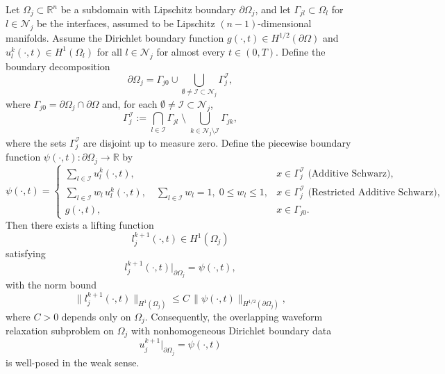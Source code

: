 \documentclass[a4paper, 11pt]{article}
\theoremstyle{remark}
\begin{document}
\begin{theorem}{}
Let $\Omega_j \subset \mathbb{R}^n$ be a subdomain with Lipschitz boundary $\partial\Omega_j$, and let $\Gamma_{jl} \subset \Omega_l$ for $l \in \mathcal{N}_j$ be the interfaces, assumed to be Lipschitz $(n-1)$-dimensional manifolds. Assume the Dirichlet boundary function $g(\cdot, t) \in H^{1/2}(\partial\Omega)$ and $u_l^k(\cdot, t) \in H^{1}(\Omega_{l})$ for all $l \in \mathcal{N}_j$ for almost every $t \in (0,T)$. Define the boundary decomposition
\[
\partial\Omega_j = \Gamma_{j0} \cup \bigcup_{\emptyset \neq \mathcal{I} \subset \mathcal{N}_j} \Gamma_j^{\mathcal{I}},
\]
where $\Gamma_{j0} = \partial \Omega_j \cap \partial \Omega$ and, for each $\emptyset \neq \mathcal{I} \subset \mathcal{N}_j$,
\[
\Gamma_j^{\mathcal{I}} := \bigcap_{l \in \mathcal{I}} \Gamma_{jl} \;\setminus\; \bigcup_{k \in \mathcal{N}_j \setminus \mathcal{I}} \Gamma_{jk},
\]
where the sets $\Gamma_j^{\mathcal{I}}$ are disjoint up to measure zero. Define the piecewise boundary function $\psi(\cdot, t) : \partial \Omega_j \to \mathbb{R}$ by
\[
\psi(\cdot, t) =
\begin{cases}
\displaystyle \sum_{l \in \mathcal{I}} u_l^k(\cdot, t), & x \in \Gamma_j^{\mathcal{I}} \text{ (Additive Schwarz)}, \\[1.5em]
\displaystyle \sum_{l \in \mathcal{I}} w_l \, u_l^k(\cdot, t), \quad \sum_{l \in \mathcal{I}} w_l = 1, \; 0 \leq w_l \leq 1, & x \in \Gamma_j^{\mathcal{I}} \text{ (Restricted Additive Schwarz)}, \\[1em]
g(\cdot, t), & x \in \Gamma_{j0}.
\end{cases}
\]
Then there exists a lifting function
\[
l_j^{k+1}(\cdot, t) \in H^1(\Omega_j)
\]
satisfying
\[
l_j^{k+1}(\cdot, t)\big|_{\partial \Omega_j} = \psi(\cdot, t),
\]
with the norm bound
\[
\lVert l_j^{k+1}(\cdot, t) \rVert_{H^1(\Omega_j)} \leq C \, \lVert \psi(\cdot, t) \rVert_{H^{1/2}(\partial \Omega_j)},
\]
where $C>0$ depends only on $\Omega_j$. Consequently, the overlapping waveform relaxation subproblem on $\Omega_j$ with nonhomogeneous Dirichlet boundary data
\[
u_j^{k+1}\big|_{\partial \Omega_j} = \psi(\cdot, t)
\]
is well-posed in the weak sense.
\end{theorem}
\end{document}
